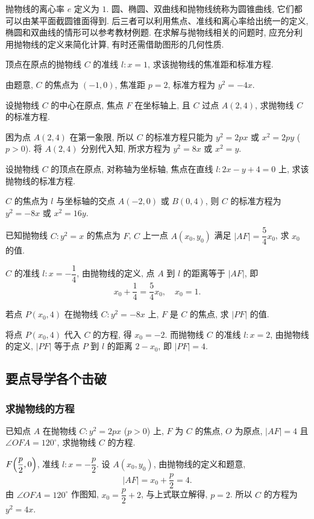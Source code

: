 抛物线的离心率 $e$ 定义为 $1$. 圆、椭圆、双曲线和抛物线统称为圆锥曲线, 它们都可以由某平面截圆锥面得到. 后三者可以利用焦点、准线和离心率给出统一的定义, 椭圆和双曲线的情形可以参考教材例题. 在求解与抛物线相关的问题时, 应充分利用抛物线的定义来简化计算, 有时还需借助图形的几何性质.

\lianxi
\begin{exercise}
    顶点在原点的抛物线 $C$ 的准线 $l\colon x=1$, 求该抛物线的焦准距和标准方程.
\end{exercise}
\beginsolution
    由题意, $C$ 的焦点为 $(-1,0)$, 焦准距 $p=2$, 标准方程为 $y^2= -4x$.
\endsolution

\begin{exercise}
    设抛物线 $C$ 的中心在原点, 焦点 $F$ 在坐标轴上, 且 $C$ 过点 $A(2,4)$, 求抛物线 $C$ 的标准方程.
\end{exercise}
\beginsolution
    困为点 $A(2,4)$ 在第一象限, 所以 $C$ 的标准方程只能为 $y^2= 2px$ 或 $x^2= 2py$ ($p>0$). 将 $A(2,4)$ 分别代入知, 所求方程为 $y^2= 8x$ 或 $x^2= y$.
\endsolution

\begin{exercise}
    设抛物线 $C$ 的顶点在原点, 对称轴为坐标轴, 焦点在直线 $l\colon 2x-y+4=0$ 上, 求该抛物线的标准方程.
\end{exercise}
\beginsolution
    $C$ 的焦点为 $l$ 与坐标轴的交点 $A(-2,0)$ 或 $B(0,4)$, 则 $C$ 的标准方程为 $y^2= -8x$ 或 $x^2= 16y$.
\endsolution

\begin{exercise}
    已知抛物线 $C\colon y^2= x$ 的焦点为 $F$, $C$ 上一点 $A(x_0,y_0)$ 满足 $|AF|= \dfrac54 x_0$, 求 $x_0$ 的值.
\end{exercise}
\beginsolution
    $C$ 的准线 $l\colon x= -\dfrac14$, 由抛物线的定义, 点 $A$ 到 $l$ 的距离等于 $|AF|$, 即
    \[x_0+ \frac14= \frac54 x_0,\quad x_0= 1.\]
\endsolution

\begin{exercise}
    若点 $P(x_0,4)$ 在抛物线 $C\colon y^2 =-8x$ 上, $F$ 是 $C$ 的焦点, 求 $|PF|$ 的值.
\end{exercise}
\beginsolution
    将点 $P(x_0,4)$ 代入 $C$ 的方程, 得 $x_0= -2$. 而抛物线 $C$ 的准线 $l\colon x=2$, 由抛物线的定义, $|PF|$ 等于点 $P$ 到 $l$ 的距离 $2-x_0$, 即 $|PF|= 4$.
\endsolution

\subsection{要点导学\quad 各个击破}
\subsubsection{求抛物线的方程}
\begin{example}
    已知点 $A$ 在抛物线 $C\colon y^2 =2px$ ($p>0$) 上, $F$ 为 $C$ 的焦点, $O$ 为原点, $|AF|= 4$ 且 $\angle OFA= 120^\circ$, 求抛物线 $C$ 的方程.
\end{example}
\beginsolution
    $F\Bigl(\dfrac{p}2,0\Bigr)$, 准线 $l\colon x= -\dfrac{p}2$. 设 $A(x_0,y_0)$, 由抛物线的定义和题意,
    \[|AF|= x_0+ \frac{p}2= 4.\]
    由 $\angle OFA= 120^\circ$ 作图知, $x_0= \dfrac{p}2+ 2$, 与上式联立解得, $p=2$. 所以 $C$ 的方程为 $y^2= 4x$.
\endsolution

